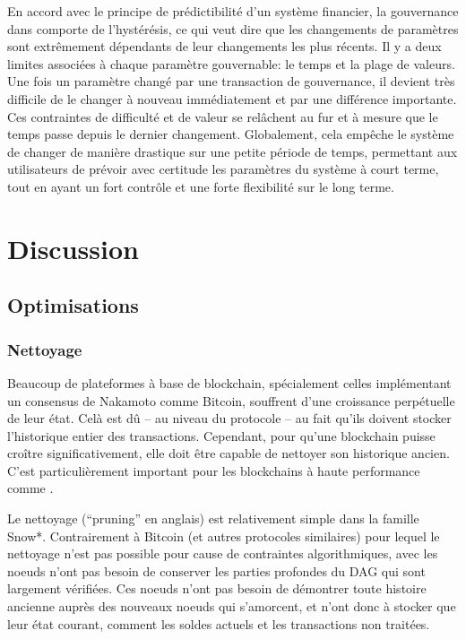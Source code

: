 \documentclass[runningheads]{llncs}
\begin{document}
En accord avec le principe de prédictibilité d'un système financier, la gouvernance dans \AVATokenName{} comporte de
l'hystérésis, ce qui veut dire que les changements de paramètres sont extrêmement dépendants de leur changements les
plus récents. Il y a deux limites associées à chaque paramètre gouvernable: le temps et la plage de valeurs. Une fois
un paramètre changé par une transaction de gouvernance, il devient très difficile de le changer à nouveau immédiatement
et par une différence importante. Ces contraintes de difficulté et de valeur se relâchent au fur et à mesure que le
temps passe depuis le dernier changement. Globalement, cela empêche le système de changer de manière drastique sur une
petite période de temps, permettant aux utilisateurs de prévoir avec certitude les paramètres du système à court terme,
tout en ayant un fort contrôle et une forte flexibilité sur le long terme.

\section{Discussion}
\label{section:discussion}
\subsection{Optimisations}
\subsubsection{Nettoyage}
Beaucoup de plateformes à base de blockchain, spécialement celles implémentant un consensus de Nakamoto comme Bitcoin,
souffrent d'une croissance perpétuelle de leur état. Celà est dû -- au niveau du protocole -- au fait qu'ils doivent
stocker l'historique entier des transactions. Cependant, pour qu'une blockchain puisse croître significativement, elle
doit être capable de nettoyer son historique ancien. C'est particulièrement important pour les blockchains à haute
performance comme \AVAPlatformName{}.

Le nettoyage (``pruning'' en anglais) est relativement simple dans la famille Snow*. Contrairement à Bitcoin (et autres
protocoles similaires) pour lequel le nettoyage n'est pas possible pour cause de contraintes algorithmiques, avec
\AVATokenName{} les noeuds n'ont pas besoin de conserver les parties profondes du DAG qui sont largement vérifiées. Ces
noeuds n'ont pas besoin de démontrer toute histoire ancienne auprès des nouveaux noeuds qui s'amorcent, et n'ont donc à
stocker que leur état courant, comment les soldes actuels et les transactions non traitées.
\end{document}
